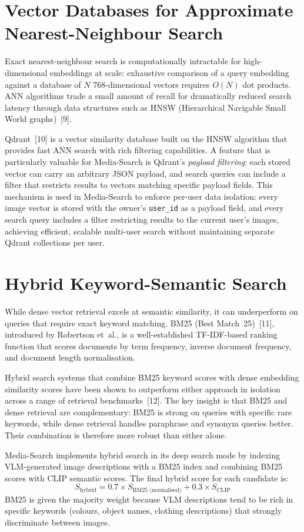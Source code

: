 \documentclass[12pt,a4paper,oneside]{report}
\begin{document}
\section{Vector Databases for Approximate Nearest-Neighbour Search}
Exact nearest-neighbour search is computationally intractable for
high-dimensional embeddings at scale: exhaustive comparison of a query
embedding against a database of $N$ 768-dimensional vectors requires
$O(N)$ dot products. ANN algorithms trade a small amount of recall for
dramatically reduced search latency through data structures such as HNSW
(Hierarchical Navigable Small World graphs)~[9].

Qdrant~[10] is a vector similarity database built on the HNSW algorithm that
provides fast ANN search with rich filtering capabilities. A feature that is
particularly valuable for Media-Search is Qdrant's \textit{payload filtering}:
each stored vector can carry an arbitrary JSON payload, and search queries can
include a filter that restricts results to vectors matching specific payload
fields. This mechanism is used in Media-Search to enforce per-user data
isolation: every image vector is stored with the owner's \texttt{user\_id}
as a payload field, and every search query includes a filter restricting
results to the current user's images, achieving efficient, scalable
multi-user search without maintaining separate Qdrant collections per user.

\section{Hybrid Keyword-Semantic Search}
While dense vector retrieval excels at semantic similarity, it can
underperform on queries that require exact keyword matching. BM25 (Best
Match~25)~[11], introduced by Robertson et~al., is a well-established
TF-IDF-based ranking function that scores documents by term frequency, inverse
document frequency, and document length normalisation.

Hybrid search systems that combine BM25 keyword scores with dense embedding
similarity scores have been shown to outperform either approach in isolation
across a range of retrieval benchmarks~[12]. The key insight is that BM25
and dense retrieval are complementary: BM25 is strong on queries with specific
rare keywords, while dense retrieval handles paraphrase and synonym queries
better. Their combination is therefore more robust than either alone.

Media-Search implements hybrid search in its deep search mode by indexing
VLM-generated image descriptions with a BM25 index and combining BM25 scores
with CLIP semantic scores. The final hybrid score for each candidate is:
\[
  S_{\text{hybrid}}
  = 0.7 \times S_{\text{BM25 (normalised)}} + 0.3 \times S_{\text{CLIP}}
\]
BM25 is given the majority weight because VLM descriptions tend to be rich in
specific keywords (colours, object names, clothing descriptions) that strongly
discriminate between images.
\end{document}
